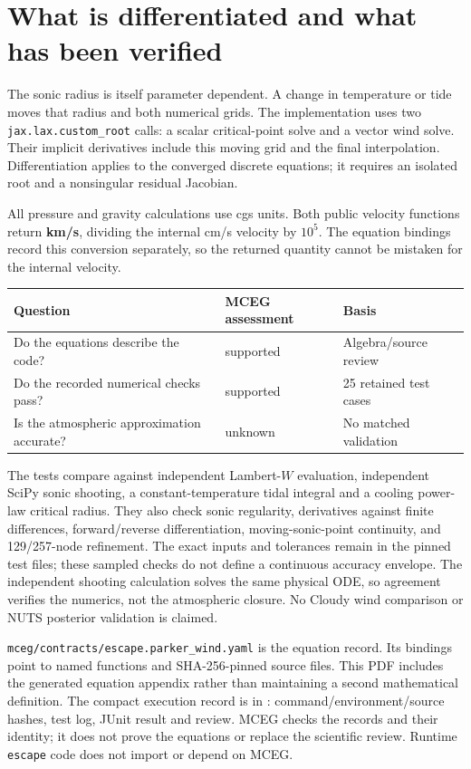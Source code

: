 \documentclass[10pt,a4paper]{article}
\begin{document}
\section{What is differentiated and what has been verified}
The sonic radius is itself parameter dependent. A change in temperature or
tide moves that radius and both numerical grids. The implementation uses two
\texttt{jax.lax.custom\_root} calls: a scalar critical-point solve and a vector
wind solve. Their implicit derivatives include this moving grid and the final
interpolation. Differentiation applies to the converged discrete equations;
it requires an isolated root and a nonsingular residual Jacobian.

All pressure and gravity calculations use cgs units. Both public velocity
functions return \textbf{km/s}, dividing the internal cm/s velocity by $10^5$.
The equation bindings record this conversion separately, so the returned
quantity cannot be mistaken for the internal velocity.

\begin{center}
\begin{tabular}{lll}
\toprule
Question & MCEG assessment & Basis \\
\midrule
Do the equations describe the code? & supported & Algebra/source review \\
Do the recorded numerical checks pass? & supported & 25 retained test cases \\
Is the atmospheric approximation accurate? & unknown & No matched validation \\
\bottomrule
\end{tabular}
\end{center}

The tests compare against independent Lambert-$W$ evaluation, independent
SciPy sonic shooting, a constant-temperature tidal integral and a cooling
power-law critical radius. They also check sonic regularity, derivatives
against finite differences, forward/reverse differentiation, moving-sonic-point
continuity, and 129/257-node refinement. The exact inputs and tolerances remain
in the pinned test files; these sampled checks do not define a continuous
accuracy envelope. The independent shooting calculation solves the same
physical ODE, so agreement verifies the numerics, not the atmospheric closure.
No Cloudy wind comparison or NUTS posterior validation is claimed.

\texttt{mceg/contracts/escape.parker\_wind.yaml} is the equation record.
Its bindings point to named functions and SHA-256-pinned source files.
This PDF includes the generated equation appendix rather than maintaining a
second mathematical definition. The compact execution record is in
: command/environment/source hashes,
test log, JUnit result and review. MCEG checks the records and their identity;
it does not prove the equations or replace the scientific review. Runtime
\texttt{escape} code does not import or depend on MCEG.
\end{document}
